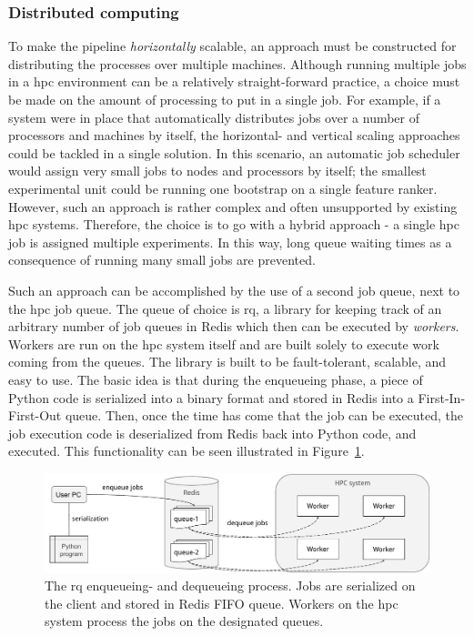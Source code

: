 \documentclass[../main.tex]{subfiles}
\begin{document}
\subsubsection{Distributed computing}
To make the pipeline \textit{horizontally} scalable, an approach must be constructed for distributing the processes over multiple machines. Although running multiple jobs in a \gls{hpc} environment can be a relatively straight-forward practice, a choice must be made on the amount of processing to put in a single job. For example, if a system were in place that automatically distributes jobs over a number of processors and machines by itself, the horizontal- and vertical scaling approaches could be tackled in a single solution. In this scenario, an automatic job scheduler would assign very small jobs to nodes and processors by itself; the smallest experimental unit could be running one bootstrap on a single feature ranker. However, such an approach is rather complex and often unsupported by existing \gls{hpc} systems. Therefore, the choice is to go with a hybrid approach - a single \gls{hpc} job is assigned multiple experiments. In this way, long queue waiting times as a consequence of running many small jobs are prevented.

Such an approach can be accomplished by the use of a second job queue, next to the \gls{hpc} job queue. The queue of choice is \gls{rq}, a library for keeping track of an arbitrary number of job queues in Redis which then can be executed by \textit{workers}. Workers are run on the \gls{hpc} system itself and are built solely to execute work coming from the queues. The library is built to be fault-tolerant, scalable, and easy to use. The basic idea is that during the enqueueing phase, a piece of Python code is serialized into a binary format and stored in Redis into a First-In-First-Out queue. Then, once the time has come that the job can be executed, the job execution code is deserialized from Redis back into Python code, and executed. This functionality can be seen illustrated in Figure~\ref{fig:schematic-pipeline-redis-queue}.

\begin{figure}[ht]
    \centering
    \includegraphics[width=\linewidth]{report/images/schematic-pipeline-redis-queue.pdf}
    \caption{The \gls{rq} enqueueing- and dequeueing process. Jobs are serialized on the client and stored in Redis FIFO queue. Workers on the \gls{hpc} system process the jobs on the designated queues.}
    \label{fig:schematic-pipeline-redis-queue}
\end{figure}
\end{document}
